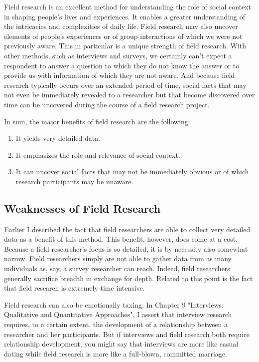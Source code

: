 Field research is an excellent method for understanding the role of social context in shaping people’s lives and experiences. It enables a greater understanding of the intricacies and complexities of daily life. Field research may also uncover elements of people’s experiences or of group interactions of which we were not previously aware. This in particular is a unique strength of field research. With other methods, such as interviews and surveys, we certainly can’t expect a respondent to answer a question to which they do not know the answer or to provide us with information of which they are not aware. And because field research typically occurs over an extended period of time, social facts that may not even be immediately revealed to a researcher but that become discovered over time can be uncovered during the course of a field research project.

In sum, the major benefits of field research are the following:

\begin{enumerate}
	\item It yields very detailed data.
	\item It emphasizes the role and relevance of social context.
	\item It can uncover social facts that may not be immediately obvious or of which research participants may be unaware.
\end{enumerate}

\subsection{Weaknesses of Field Research}

Earlier I described the fact that field researchers are able to collect very detailed data as a benefit of this method. This benefit, however, does come at a cost. Because a field researcher’s focus is so detailed, it is by necessity also somewhat narrow. Field researchers simply are not able to gather data from as many individuals as, say, a survey researcher can reach. Indeed, field researchers generally sacrifice breadth in exchange for depth. Related to this point is the fact that field research is extremely time intensive.

Field research can also be emotionally taxing. In Chapter 9 "Interviews: Qualitative and Quantitative Approaches", I assert that interview research requires, to a certain extent, the development of a relationship between a researcher and her participants. But if interviews and field research both require relationship development, you might say that interviews are more like casual dating while field research is more like a full-blown, committed marriage.

